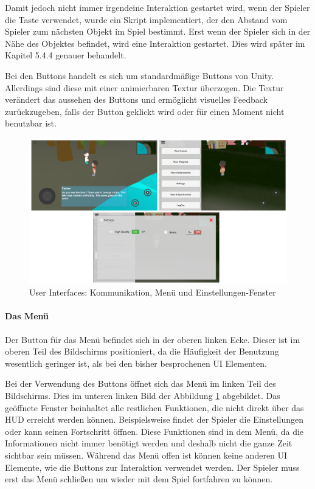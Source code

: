 					Damit jedoch nicht immer irgendeine Interaktion gestartet wird, wenn der Spieler die Taste verwendet, wurde ein Skript implementiert, der den Abstand vom Spieler zum nächsten Objekt im Spiel bestimmt. Erst wenn der Spieler sich in der Nähe des Objektes befindet, wird eine Interaktion gestartet. Dies wird später im Kapitel 5.4.4 genauer behandelt.

					Bei den Buttons handelt es sich um standardmäßige Buttons von Unity. Allerdings sind diese mit einer animierbaren Textur überzogen. Die Textur verändert das aussehen des Buttons und ermöglicht visuelles Feedback zurückzugeben, falls der Button geklickt wird oder für einen Moment nicht benutzbar ist.

					\begin{figure}[htbp]
						\centering 
						\label{userInterfaces}
						\includegraphics[width=\textwidth]{pics/userInterface.png}
						\caption{User Interfaces: Kommunikation, Menü und Einstellungen-Fenster}
					\end{figure}

				\paragraph{Das Menü}
					Der Button für das Menü befindet sich in der oberen linken Ecke. Dieser ist im oberen Teil des Bildschirms positioniert, da die Häufigkeit der Benutzung wesentlich geringer ist, als bei den bisher besprochenen \ac{UI} Elementen.

					Bei der Verwendung des Buttons öffnet sich das Menü im linken Teil des Bildschirms. Dies im unteren linken Bild der Abbildung \ref{userInterfaces} abgebildet. Das geöffnete Fenster beinhaltet alle restlichen Funktionen, die nicht direkt über das \ac{HUD} erreicht werden können. Beispielsweise findet der Spieler die Einstellungen oder kann seinen Fortschritt öffnen. Diese Funktionen sind in dem Menü, da die Informationen nicht immer benötigt werden und deshalb nicht die ganze Zeit sichtbar sein müssen. Während das Menü offen ist können keine anderen \ac{UI} Elemente, wie die Buttons zur Interaktion verwendet werden. Der Spieler muss erst das Menü schließen um wieder mit dem Spiel fortfahren zu können. 

